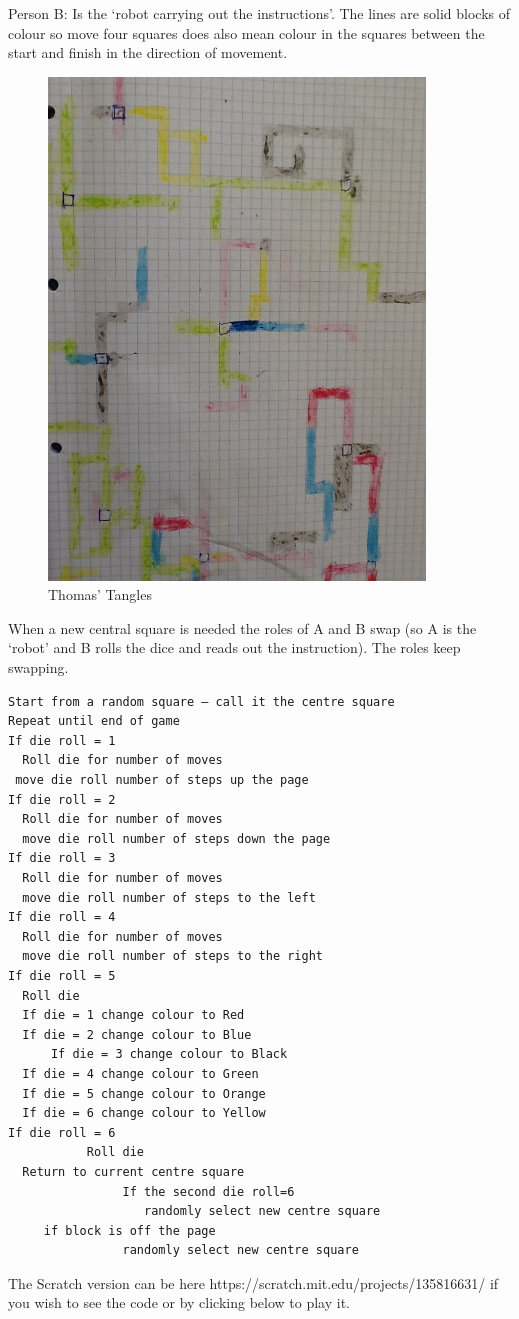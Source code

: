 Person B: Is the ‘robot carrying out the instructions'. The lines are solid blocks of colour so move four squares does also mean colour in the squares between the start and finish in the direction of movement.

\begin{figure}
    \centering
    \includegraphics[width=10cm]{chapters/chapterCT1/figures/tt1.JPG}
    \caption{Thomas' Tangles}
    \label{fig:ThomasTangles1}
\end{figure}

When a new central square is needed the roles of A and B swap (so A is the ‘robot’ and B rolls the dice and reads out the instruction). The roles keep swapping.

\begin{lstlisting}
Start from a random square – call it the centre square
Repeat until end of game
If die roll = 1
  Roll die for number of moves
 move die roll number of steps up the page
If die roll = 2
  Roll die for number of moves
  move die roll number of steps down the page
If die roll = 3
  Roll die for number of moves
  move die roll number of steps to the left 
If die roll = 4
  Roll die for number of moves
  move die roll number of steps to the right
If die roll = 5
  Roll die
  If die = 1 change colour to Red
  If die = 2 change colour to Blue
      If die = 3 change colour to Black
  If die = 4 change colour to Green
  If die = 5 change colour to Orange
  If die = 6 change colour to Yellow
If die roll = 6
           Roll die
  Return to current centre square
                If the second die roll=6
                   randomly select new centre square
     if block is off the page
                randomly select new centre square
\end{lstlisting}

The Scratch version can be here https://scratch.mit.edu/projects/135816631/  if you wish to see the code or by clicking below to play it.

